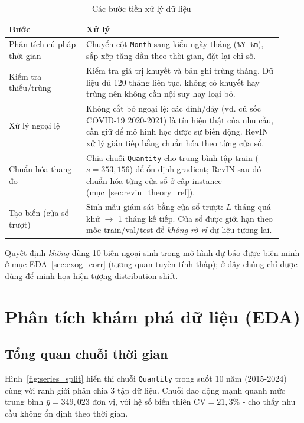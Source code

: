 \documentclass[12pt, a4paper]{report}
\begin{document}
\begin{table}[H]
\centering
\caption{Các bước tiền xử lý dữ liệu}
\label{tab:preprocess}
\renewcommand{\arraystretch}{1.3}
\begin{tabular}{|>{\raggedright\arraybackslash}p{0.26\linewidth}|>{\raggedright\arraybackslash}p{0.66\linewidth}|}
\hline
\rowcolor{gray!18}
\textbf{Bước} & \textbf{Xử lý} \\
\hline
Phân tích cú pháp thời gian & Chuyển cột \texttt{Month} sang kiểu ngày tháng (\texttt{\%Y-\%m}), sắp xếp tăng dần theo thời gian, đặt lại chỉ số. \\
\hline
Kiểm tra thiếu/trùng & Kiểm tra giá trị khuyết và bản ghi trùng tháng. Dữ liệu đủ 120 tháng liên tục, không có khuyết hay trùng nên không cần nội suy hay loại bỏ. \\
\hline
Xử lý ngoại lệ & Không cắt bỏ ngoại lệ: các đỉnh/đáy (vd. cú sốc COVID-19 2020-2021) là tín hiệu thật của nhu cầu, cần giữ để mô hình học được sự biến động. RevIN xử lý gián tiếp bằng chuẩn hóa theo từng cửa sổ. \\
\hline
Chuẩn hóa thang đo & Chia chuỗi \texttt{Quantity} cho trung bình tập train ($s = 353{,}156$) để ổn định gradient; RevIN sau đó chuẩn hóa từng cửa sổ ở cấp instance (mục~\ref{sec:revin_theory_ref}). \\
\hline
Tạo biến (cửa sổ trượt) & Sinh mẫu giám sát bằng cửa sổ trượt: $L$ tháng quá khứ $\rightarrow$ 1 tháng kế tiếp. Cửa sổ được giới hạn theo mốc train/val/test để \textit{không rò rỉ} dữ liệu tương lai. \\
\hline
\end{tabular}
\end{table}

Quyết định \textit{không} dùng 10 biến ngoại sinh trong mô hình dự báo được biện minh ở mục EDA~\ref{sec:exog_corr} (tương quan tuyến tính thấp); ở đây chúng chỉ được dùng để minh họa hiện tượng distribution shift.

\section{Phân tích khám phá dữ liệu (EDA)}

\subsection{Tổng quan chuỗi thời gian}\label{sec:eda_overview}

Hình~\ref{fig:series_split} hiển thị chuỗi \texttt{Quantity} trong suốt 10 năm (2015-2024) cùng với ranh giới phân chia 3 tập dữ liệu. Chuỗi dao động mạnh quanh mức trung bình $\bar{y} = 349{,}023$ đơn vị, với hệ số biến thiên $\text{CV} = 21{,}3\%$ - cho thấy nhu cầu không ổn định theo thời gian.
\end{document}
